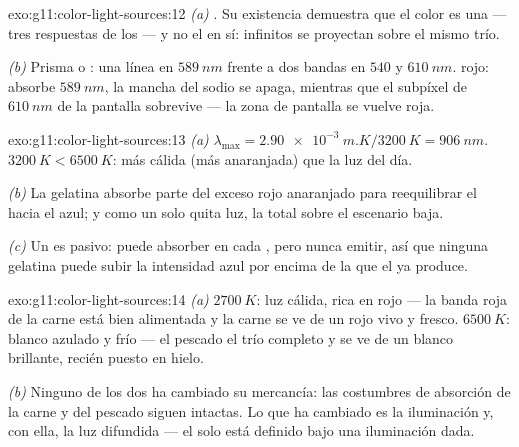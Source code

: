 \begin{solution}{exo:g11:color-light-sources:12}
\emph{(a)} . Su existencia demuestra que el color es una
 --- tres respuestas de los  --- y no el  en sí:
infinitos  se proyectan sobre el mismo trío.

\emph{(b)} Prisma o : una línea en $\qty{589}{nm}$ frente
a dos bandas en $540$ y $\qty{610}{nm}$.  rojo: absorbe
$\qty{589}{nm}$, la mancha del sodio se apaga, mientras que el subpíxel
de $\qty{610}{nm}$ de la pantalla sobrevive --- la zona de pantalla se
vuelve roja.
\end{solution}

\begin{solution}{exo:g11:color-light-sources:13}
\emph{(a)} $\lambda_{\max} = \qty{2.90e-3}{m.K}/\qty{3200}{K} =
\qty{906}{nm}$. 
$\qty{3200}{K} < \qty{6500}{K}$: más cálida (más anaranjada) que la luz
del día.

\emph{(b)} La gelatina absorbe parte del exceso rojo anaranjado para
reequilibrar el  hacia el azul; y como un  solo quita luz,
la  total sobre el escenario baja.

\emph{(c)} Un  es pasivo: puede absorber en cada ,
pero nunca emitir, así que ninguna gelatina puede subir la intensidad
azul por encima de la que el  ya produce.
\end{solution}

\begin{solution}{exo:g11:color-light-sources:14}
\emph{(a)} $\qty{2700}{K}$: luz cálida, rica en rojo --- la banda roja
de la carne está bien alimentada y la carne se ve de un rojo vivo y
fresco. $\qty{6500}{K}$: blanco azulado y frío --- el pescado  el
trío completo y se ve de un blanco brillante, recién puesto en hielo.

\emph{(b)} Ninguno de los dos ha cambiado su mercancía: las costumbres
de absorción de la carne y del pescado siguen intactas. Lo que ha
cambiado es la iluminación y, con ella, la luz difundida --- el  solo está definido bajo una iluminación dada.
\end{solution}

